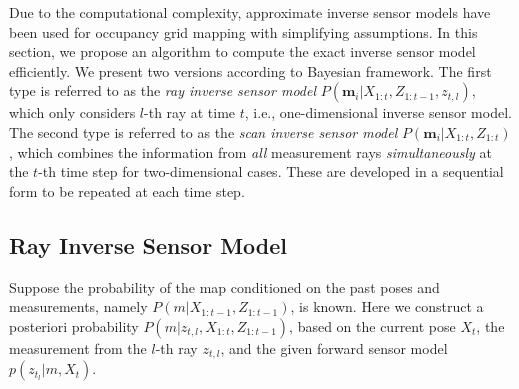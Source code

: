 \documentclass[letterpaper, 10pt, conference]{ieeeconf}
\begin{document}
Due to the computational complexity, approximate inverse sensor models have been used for occupancy grid mapping with simplifying assumptions. In this section, we propose an algorithm to compute the exact inverse sensor model efficiently. 
We present two versions according to Bayesian framework. The first type is referred to as the \emph{ray inverse sensor model} $P(\mathbf{m}_i|X_{1:t},Z_{1:t-1},z_{t,l})$, which only considers $l$-th ray at time $t$, i.e., one-dimensional inverse sensor model. The second type is referred to as the \emph{scan inverse sensor model} $P(\mathbf{m}_i|X_{1:t},Z_{1:t})$, which combines the information from \emph{all} measurement rays \emph{simultaneously} at the $t$-th time step for two-dimensional cases. These are developed in a sequential form to be repeated at each time step.



\subsection{Ray Inverse Sensor Model}

Suppose the probability of the map conditioned on the past poses and measurements, namely $P(m|X_{1:t-1},Z_{1:t-1})$, is known. Here we construct a posteriori probability $P(m|z_{t,l},X_{1:t},Z_{1:t-1})$, based on the current pose $X_t$, the measurement from the $l$-th ray $z_{t,l}$, and the given forward sensor model $p(z_{t_l}|m,X_t)$.
\end{document}
